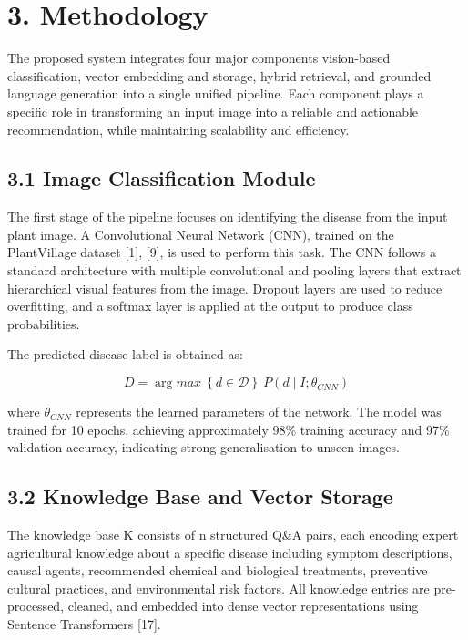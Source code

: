 \section*{3. Methodology}\label{methodology}

The proposed system integrates four major components vision-based
classification, vector embedding and storage, hybrid retrieval, and
grounded language generation into a single unified pipeline. Each
component plays a specific role in transforming an input image into a
reliable and actionable recommendation, while maintaining scalability
and efficiency.

\subsection*{3.1 Image Classification
Module}\label{image-classification-module}

The first stage of the pipeline focuses on identifying the disease from
the input plant image. A Convolutional Neural Network (CNN), trained on
the PlantVillage dataset {[}1{]}, {[}9{]}, is used to perform this task.
The CNN follows a standard architecture with multiple convolutional and
pooling layers that extract hierarchical visual features from the image.
Dropout layers are used to reduce overfitting, and a softmax layer is
applied at the output to produce class probabilities.

The predicted disease label is obtained as:

\[D = \arg max\ \left\{ d\mathcal{\in D} \right\}\ P(d \mid I;\theta_{CNN})
\]

where \(\theta_{CNN}\) represents the learned parameters of the network.
The model was trained for 10 epochs, achieving approximately 98\%
training accuracy and 97\% validation accuracy, indicating strong
generalisation to unseen images.

\subsection*{3.2 Knowledge Base and Vector
Storage}\label{knowledge-base-and-vector-storage}

The knowledge base K consists of n structured Q\&A pairs, each encoding
expert agricultural knowledge about a specific disease including symptom
descriptions, causal agents, recommended chemical and biological
treatments, preventive cultural practices, and environmental risk
factors. All knowledge entries are pre-processed, cleaned, and embedded
into dense vector representations using Sentence Transformers {[}17{]}.

